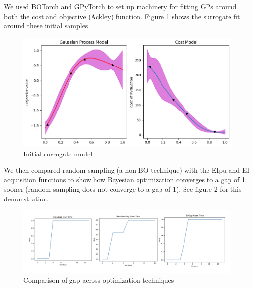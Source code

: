 \documentclass{article}
\newcommand{\bfx}{\textbf{x}}
\begin{document}
We used BOTorch and GPyTorch to set up machinery for fitting GPs around both the cost and objective (Ackley) function. Figure 1 shows the surrogate fit around these initial samples.

\begin{figure}
    \centering
    \includegraphics[width=0.7\linewidth]{graphics/gp_cost.png}
    \caption{Initial surrogate model}
\end{figure}

We then compared random sampling (a non BO technique) with the EIpu and EI acquisition functions to show how Bayesian optimization converges to a gap of 1 sooner (random sampling does not converge to a gap of 1). See figure 2 for this demonstration.

\begin{figure}
    \centering
    \includegraphics[width=1\linewidth]{graphics/gaps.png}
    \caption{Comparison of gap across optimization techniques}
\end{figure}



\nocite{*}
\end{document}
